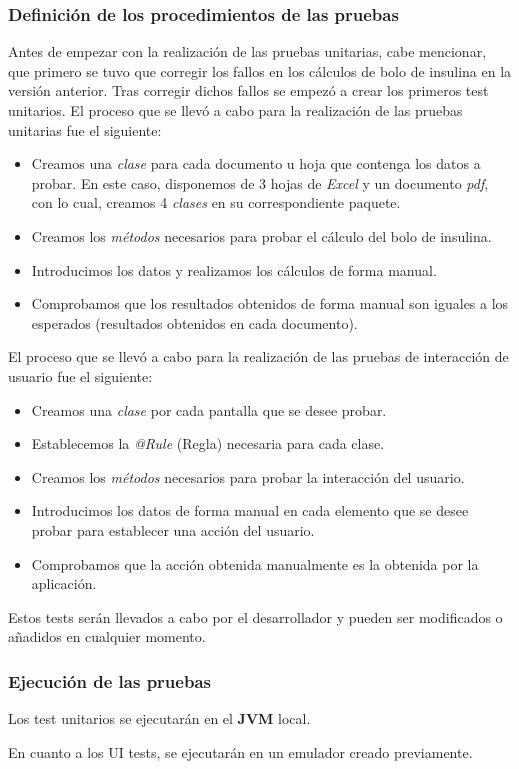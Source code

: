 \subsubsection{Definición de los procedimientos de las pruebas}
Antes de empezar con la realización de las pruebas unitarias, cabe mencionar, que primero se tuvo que corregir los fallos en los cálculos de bolo de insulina en la versión anterior. Tras corregir dichos fallos se empezó a crear los primeros test unitarios.
El proceso que se llevó a cabo para la realización de las pruebas unitarias fue el siguiente:
\begin{itemize}
	\item Creamos una \textit{clase} para cada documento u hoja que contenga los datos a probar. En este caso, disponemos de 3 hojas de \textit{Excel} y un documento \textit{pdf}, con lo cual, creamos 4 \textit{clases} en su correspondiente paquete.
	\item Creamos los \textit{métodos} necesarios para probar el cálculo del bolo de insulina.
	\item Introducimos los datos y realizamos los cálculos de forma manual.
	\item Comprobamos que los resultados obtenidos de forma manual son iguales a los esperados (resultados obtenidos en cada documento).
\end{itemize}

El proceso que se llevó a cabo para la realización de las pruebas de interacción de usuario fue el siguiente:
\begin{itemize}
	\item Creamos una \textit{clase} por cada pantalla que se desee probar.
	\item Establecemos la \textit{@Rule} (Regla) necesaria para cada clase.
	\item Creamos los \textit{métodos} necesarios para probar la interacción del usuario.
	\item Introducimos los datos de forma manual en cada elemento que se desee probar para establecer una acción del usuario.
	\item Comprobamos que la acción obtenida manualmente es la obtenida por la aplicación.
\end{itemize}
Estos tests serán llevados a cabo por el desarrollador y pueden ser modificados o añadidos en cualquier momento.
\subsubsection{Ejecución de las pruebas}
Los test unitarios se ejecutarán en el \textbf{JVM} local.

En cuanto a los UI tests, se ejecutarán en un emulador creado previamente.


